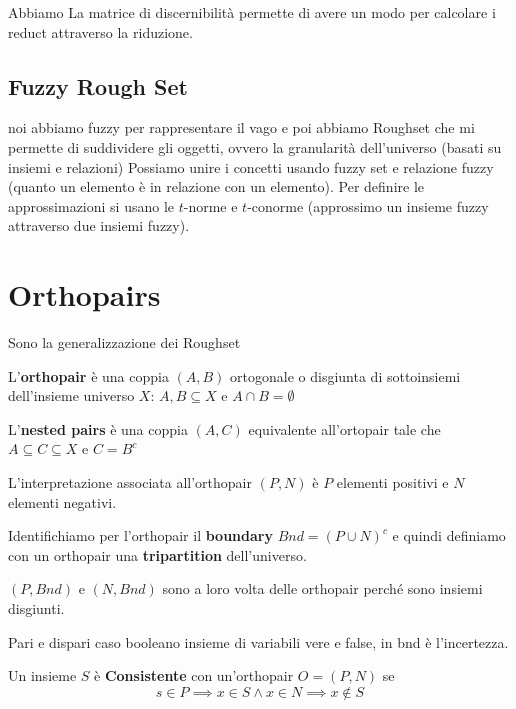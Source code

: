 Abbiamo La matrice di discernibilità permette di avere un modo per calcolare i reduct 
attraverso la riduzione.
\subsection{Fuzzy Rough Set}
noi abbiamo fuzzy per rappresentare il vago e poi abbiamo Roughset che mi permette 
di suddividere gli oggetti, ovvero la granularità dell'universo (basati su insiemi e relazioni)
Possiamo unire i concetti usando fuzzy set e relazione fuzzy (quanto un elemento è
in relazione con un elemento). Per definire le approssimazioni si usano le $t$-norme 
e $t$-conorme (approssimo un insieme fuzzy attraverso due insiemi fuzzy).


\section{Orthopairs}
Sono la generalizzazione dei Roughset 
\begin{definizione}
    L'\textbf{orthopair} è una coppia $(A,B)$ ortogonale o disgiunta di sottoinsiemi
    dell'insieme universo $X$: $A,B\subseteq X$ e $A\cap B=\emptyset$
\end{definizione}
\begin{definizione}
    L'\textbf{nested pairs} è una coppia $(A,C)$ equivalente all'ortopair tale che 
    $A\subseteq C \subseteq X$ e $C =B^c$
\end{definizione}

L'interpretazione associata all'orthopair $(P,N)$ è $P$ elementi positivi e $N$ 
elementi negativi.

Identifichiamo per l'orthopair il \textbf{boundary} $Bnd=(P\cup N )^c$ e quindi 
definiamo con un orthopair una \textbf{tripartition} dell'universo.

\begin{nota}
    $(P,Bnd)$ e $(N, Bnd)$ sono a loro volta delle orthopair perché sono insiemi disgiunti.
\end{nota}

\begin{esempio}
    Pari e dispari
    caso booleano insieme di variabili vere e false, in bnd è l'incertezza.
\end{esempio}

\begin{definizione}
    Un insieme $S$ è \textbf{Consistente} con un'orthopair $O = (P,N)$ se 
    $$s\in P \implies x\in S\land x\in N \implies x\not \in S$$
\end{definizione}

